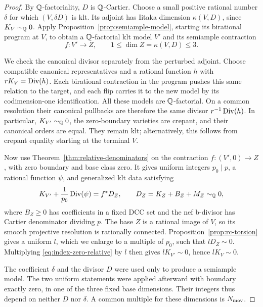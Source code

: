 \begin{proof}
By \(\mathbb Q\)-factoriality, \(D\) is \(\mathbb Q\)-Cartier.  Choose a small
positive rational number \(\delta\) for which \((V,\delta D)\) is klt.
Its adjoint has Iitaka dimension \(\kappa(V,D)\), since
\(K_V\sim_{\mathbb Q}0\).  Apply Proposition~\ref{prop:semiample-model},
starting its birational program at \(V\), to obtain a \(\mathbb Q\)-factorial
klt model \(V'\) and its semiample contraction
\[
                       f:V'\longrightarrow Z,
          \qquad 1\le\dim Z=\kappa(V,D)\le3.
\]

We check the canonical divisor separately from the perturbed adjoint.
Choose compatible canonical representatives and a rational function
\(h\) with \(rK_V=\operatorname{Div}(h)\).  Each birational contraction in the program
pushes this same relation to the target, and each flip carries it to
the new model by its codimension-one identification.  All these
models are \(\mathbb Q\)-factorial.  On a common resolution their canonical
pullbacks are therefore the same divisor \(r^{-1}\operatorname{Div}(h)\).
In particular, \(K_{V'}\sim_{\mathbb Q}0\), the zero-boundary varieties are
crepant, and their canonical orders are equal.  They remain klt;
alternatively, this follows from crepant equality starting at the
terminal \(V\).

Now use Theorem~\ref{thm:relative-denominators} on the contraction
\(f:(V',0)\to Z\), with zero boundary and base class zero.  It gives
uniform integers \(p_0\mid p\), a rational function \(\psi\), and
generalized klt data satisfying
\begin{equation}\label{eq:index-zero-relative}
 K_{V'}+\frac1{p_0}\operatorname{Div}(\psi)
       =f^*D_Z,\qquad
 D_Z=K_Z+B_Z+M_Z\sim_{\mathbb Q}0,
\end{equation}
where \(B_Z\ge0\) has coefficients in a fixed DCC set and the nef
b-divisor has Cartier denominator dividing \(p\).  The base \(Z\) is a
rational image of \(V\), so its smooth projective resolution is
rationally connected.  Proposition~\ref{prop:rc-torsion} gives a
uniform \(l\), which we enlarge to a multiple of \(p_0\), such that
\(lD_Z\sim0\).  Multiplying \eqref{eq:index-zero-relative} by \(l\)
then gives \(lK_{V'}\sim0\), hence \(lK_V\sim0\).

The coefficient \(\delta\) and the divisor \(D\) were used only to
produce a semiample model.  The two uniform statements were applied
afterward with boundary exactly zero, in one of the three fixed base
dimensions.  Their integers thus depend on neither \(D\) nor
\(\delta\).  A common multiple for these dimensions is
\(N_{\rm mov}\).
\end{proof}

